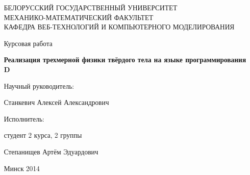 \begin{titlepage}
\newpage

\begin{center}
БЕЛОРУССКИЙ ГОСУДАРСТВЕННЫЙ УНИВЕРСИТЕТ \\
МЕХАНИКО-МАТЕМАТИЧЕСКИЙ ФАКУЛЬТЕТ\\
КАФЕДРА ВЕБ-ТЕХНОЛОГИЙ И КОМПЬЮТЕРНОГО МОДЕЛИРОВАНИЯ
\end{center}
 
\vspace{14em}

\begin{center}
Курсовая работа
\end{center}

\begin{center}
\Large \textbf{Реализация трехмерной физики твёрдого тела \linebreak на языке программирования D}
\end{center}

\vspace{11em}
 
\begin{flushright}
\parbox{0.45\textwidth}{
Научный руководитель:
\vspace{0.25em}

Станкевич Алексей Александрович
\vspace{2em}

Исполнитель:
\vspace{0.25em}

студент 2 курса, 2 группы

Степанищев Артём Эдуардович
}%
\end{flushright}
 
\vspace{\fill}

\begin{center}
Минск 2014
\end{center}

\end{titlepage} 
